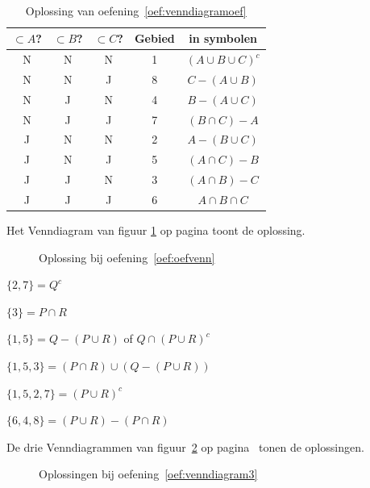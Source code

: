 \begin{Oplossing}{1.5}
$\qquad$ \\
\begin{table}[h!tbp]
\centering
\caption{Oplossing van oefening~\ref{oef:venndiagramoef}}
\begin{tabular}{ccccc}
\toprule
$\subset A$? & $\subset B$? & $\subset C$? & Gebied & in symbolen \\
\midrule
N & N & N & 1  & $(A\cup B \cup C)^c$ \\
N & N & J & 8 & $C-(A\cup B)$  \\
N & J & N &  4 & $B-(A\cup C)$  \\
N & J & J &7   &$(B\cap C)-A$   \\
J & N & N &  2 & $A-(B\cup C)$  \\
J & N & J & 5  & $(A\cap C)-B$  \\
J & J & N & 3  & $(A\cap B)-C$  \\
J & J & J & 6  & $A\cap B\cap C$  \\
\bottomrule
\end{tabular}
\label{tab:venndiagram2}
\end{table}

\end{Oplossing}
\begin{Oplossing}{1.6}
Het Venndiagram van figuur \ref{fig:UPQ} op pagina \pageref{fig:UPQ} toont de oplossing.
\begin{figure}[htbp]
\centering

\caption{Oplossing bij oefening~\ref{oef:oefvenn}}
\label{fig:UPQ}
\end{figure}
\end{Oplossing}
\begin{Oplossing}{1.7}
\item $\{2,7\}=Q^c$
\item $\{3\}=P\cap R$
\item $\{1,5\}=Q-(P\cup R)$ of $Q \cap (P \cup R)^c$
\item $\{1,5,3\}=(P\cap R)\cup (Q-(P\cup R))$
\item $\{1,5,2,7\}=(P\cup R)^c$
\item $\{6,4,8\}=(P\cup R)- (P \cap R)$
\end{Oplossing}
\begin{Oplossing}{1.8}
De drie Venndiagrammen van figuur~\ref{fig:Venn3} op pagina~\pageref{fig:Venn3} tonen de oplossingen.
\begin{figure}[h!tbp]
\centering
\subfloat[oef a]{}\qquad
\subfloat[oef b]{}\qquad
\subfloat[oef c]{}
\caption{Oplossingen bij oefening~\ref{oef:venndiagram3} }
\label{fig:Venn3}
\end{figure}
\end{Oplossing}
